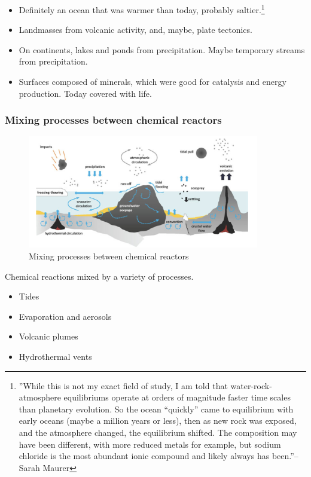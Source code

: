 \documentclass[]{article}
\begin{document}
  
  \begin{itemize}
  	\item  Definitely an ocean that was warmer than today, probably saltier.\footnote{''While this is not my exact field of study, I am told that water-rock-atmosphere equilibriums operate at orders of magnitude faster time scales than planetary evolution. So the ocean “quickly” came to equilibrium with early oceans (maybe a million years or less), then as new rock was exposed, and the atmosphere changed, the equilibrium shifted. The composition may have been different, with more reduced metals for example, but sodium chloride is the most abundant ionic compound and likely always has been.''--Sarah Maurer}\cite{knauth1998salinity} 
  	\item Landmasses from volcanic activity, and, maybe, plate tectonics.
  	\item On continents, lakes and ponds from precipitation.  Maybe temporary streams from precipitation.
  	\item Surfaces composed of minerals, which were good for catalysis and energy production. Today covered with life.
  \end{itemize}


\subsubsection{Mixing processes between chemical reactors}
\begin{figure}[h!]
	\caption{Mixing processes between chemical reactors \cite{stueken2013did}}
	\includegraphics[width=0.9\textwidth]{MixingProcesses}
\end{figure}
Chemical reactions mixed by a variety of processes.

\begin{itemize}
	\item Tides
	\item Evaporation and aerosols
	\item Volcanic plumes
	\item Hydrothermal vents
\end{itemize}
  
\end{document}
